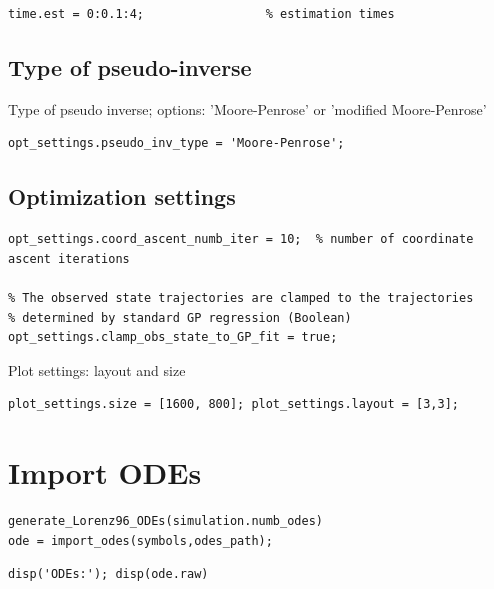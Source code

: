 \color{RoyalPurple}\begin{verbatim}
time.est = 0:0.1:4;                 % estimation times
\end{verbatim}
\color{black}
\begin{par}
\subsection{ Type of pseudo-inverse } Type of pseudo inverse; options: 'Moore-Penrose' or 'modified Moore-Penrose'
\end{par} \vspace{1em}
\color{RoyalPurple}\begin{verbatim}
opt_settings.pseudo_inv_type = 'Moore-Penrose';
\end{verbatim}
\color{black}
\begin{par}
\subsection{ Optimization settings }
\end{par} \vspace{1em}
\color{RoyalPurple}\begin{verbatim}
opt_settings.coord_ascent_numb_iter = 10;  % number of coordinate ascent iterations

% The observed state trajectories are clamped to the trajectories
% determined by standard GP regression (Boolean)
opt_settings.clamp_obs_state_to_GP_fit = true;
\end{verbatim}
\color{black}
\begin{par}
Plot settings: layout and size
\end{par} \vspace{1em}
\color{RoyalPurple}\begin{verbatim}
plot_settings.size = [1600, 800]; plot_settings.layout = [3,3];
\end{verbatim}
\color{black}


\section{Import ODEs}

\color{RoyalPurple}\begin{verbatim}
generate_Lorenz96_ODEs(simulation.numb_odes)
ode = import_odes(symbols,odes_path);
\end{verbatim}
\color{black}
\color{RoyalPurple}\begin{verbatim}
disp('ODEs:'); disp(ode.raw)
\end{verbatim}
\color{black}

